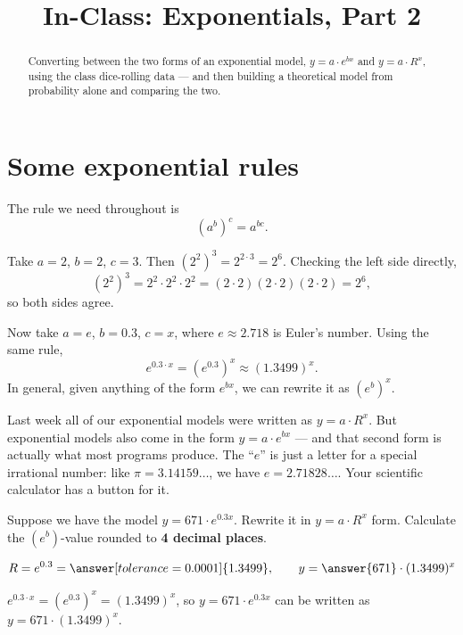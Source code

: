 \documentclass[12pt]{ximera}
\title{In-Class: Exponentials, Part 2}
\begin{document}
\begin{abstract}
Converting between the two forms of an exponential model, $y = a \cdot e^{bx}$ and
$y = a \cdot R^{x}$, using the class dice-rolling data --- and then building a
theoretical model from probability alone and comparing the two.
\end{abstract}
\maketitle

\section*{Some exponential rules}

The rule we need throughout is
\[
\left(a^{b}\right)^{c} = a^{bc}.
\]

\begin{example}
Take $a = 2$, $b = 2$, $c = 3$. Then $\left(2^{2}\right)^{3} = 2^{2 \cdot 3} = 2^{6}$.
Checking the left side directly,
\[
\left(2^{2}\right)^{3} = 2^{2} \cdot 2^{2} \cdot 2^{2}
= (2 \cdot 2)(2 \cdot 2)(2 \cdot 2) = 2^{6},
\]
so both sides agree.
\end{example}

\begin{example}
Now take $a = e$, $b = 0.3$, $c = x$, where $e \approx 2.718$ is Euler's number.
Using the same rule,
\[
e^{0.3 \cdot x} = \left(e^{0.3}\right)^{x} \approx (1.3499)^{x}.
\]
In general, given anything of the form $e^{bx}$, we can rewrite it as
$\left(e^{b}\right)^{x}$.
\end{example}

Last week all of our exponential models were written as $y = a \cdot R^{x}$. But
exponential models also come in the form $y = a \cdot e^{bx}$ --- and that second
form is actually what most programs produce. The ``$e$'' is just a letter for a
special irrational number: like $\pi = 3.14159\ldots$, we have
$e = 2.71828\ldots$. Your scientific calculator has a button for it.

\begin{problem}
Suppose we have the model $y = 671 \cdot e^{0.3x}$. Rewrite it in $y = a \cdot R^{x}$
form. Calculate the $\left(e^{b}\right)$-value rounded to \textbf{4 decimal places}.

\[
R = e^{0.3} = \answer[tolerance=0.0001]{1.3499},
\qquad
y = \answer{671} \cdot (1.3499)^{x}
\]

\begin{solution}
$e^{0.3 \cdot x} = \left(e^{0.3}\right)^{x} = (1.3499)^{x}$, so
$y = 671 \cdot e^{0.3x}$ can be written as $y = 671 \cdot (1.3499)^{x}$.
\end{solution}
\end{problem}
\end{document}
